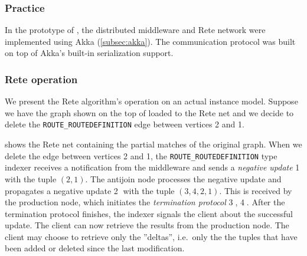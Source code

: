 \subsubsection{Practice}

In the prototype of \iqd{}, the distributed middleware and Rete network were implemented using Akka (\autoref{subsec:akka}). The communication protocol was built on top of Akka's built-in serialization support.


\subsubsection{Rete operation}

We present the Rete algorithm's operation on an actual instance model. Suppose we have the graph shown on the top of  loaded to the Rete net and we decide to delete the \texttt{ROUTE\_ROUTEDEFINITION} edge between vertices 2 and 1.


 shows the Rete net containing the partial matches of the original graph. When we delete the edge between vertices 2 and 1, the \texttt{ROUTE\_ROUTEDEFINITION} type indexer receives a notification from the middleware and sends a \textit{negative update} \textcircled{1} with the tuple $(2, 1)$. The antijoin node processes the negative update and propagates a negative update \textcircled{2} with the tuple $(3, 4, 2, 1)$. This is received by the production node, which initiates the \textit{termination protocol} \textcircled{3}, \textcircled{4}. After the termination protocol finishes, the indexer signals the client about the successful update. The client can now retrieve the results from the production node. The client may choose to retrieve only the ''deltas'', i.e.\ only the the tuples that have been added or deleted since the last modification.


